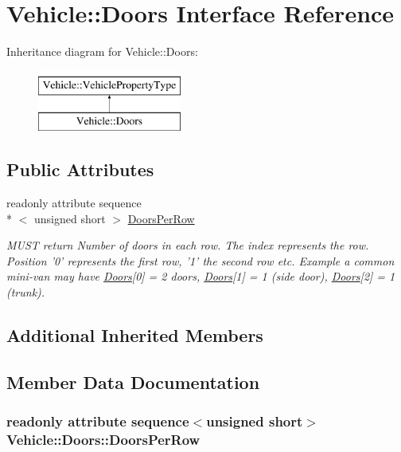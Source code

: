 \hypertarget{interfaceVehicle_1_1Doors}{\section{Vehicle\-:\-:Doors Interface Reference}
\label{interfaceVehicle_1_1Doors}
}
Inheritance diagram for Vehicle\-:\-:Doors\-:\begin{figure}[H]
\begin{center}
\leavevmode
\includegraphics[height=2.000000cm]{interfaceVehicle_1_1Doors}
\end{center}
\end{figure}
\subsection*{Public Attributes}
\begin{DoxyCompactItemize}
\item 
readonly attribute sequence\\*
$<$ unsigned short $>$ \hyperlink{interfaceVehicle_1_1Doors_a6cd63a45c3afefc1c640ad0760a1cda0}{Doors\-Per\-Row}
\begin{DoxyCompactList}\small\item\em M\-U\-S\-T return Number of doors in each row. The index represents the row. Position '0' represents the first row, '1' the second row etc. Example a common mini-\/van may have \hyperlink{interfaceVehicle_1_1Doors}{Doors}\mbox{[}0\mbox{]} = 2 doors, \hyperlink{interfaceVehicle_1_1Doors}{Doors}\mbox{[}1\mbox{]} = 1 (side door), \hyperlink{interfaceVehicle_1_1Doors}{Doors}\mbox{[}2\mbox{]} = 1 (trunk). \end{DoxyCompactList}\end{DoxyCompactItemize}
\subsection*{Additional Inherited Members}


\subsection{Member Data Documentation}
\hypertarget{interfaceVehicle_1_1Doors_a6cd63a45c3afefc1c640ad0760a1cda0}{
\subsubsection[{Doors\-Per\-Row}]{\setlength{\rightskip}{0pt plus 5cm}readonly attribute sequence$<$unsigned short$>$ Vehicle\-::\-Doors\-::\-Doors\-Per\-Row}}\label{interfaceVehicle_1_1Doors_a6cd63a45c3afefc1c640ad0760a1cda0}


